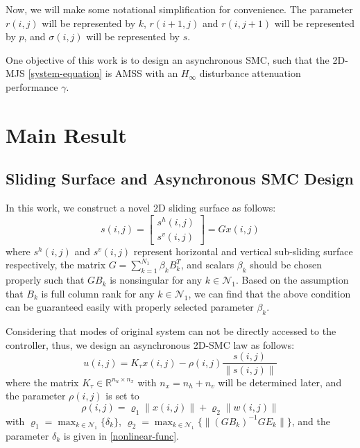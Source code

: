 \documentclass[journal,final,twocolumn]{IEEEtran}
\begin{document}
	Now, we will make some notational simplification for convenience. The parameter $r(i,j)$ will be represented by $k$, $r(i+1,j)$ and $r(i,j+1)$ will be represented by $p$, and $\sigma(i,j)$ will be represented by $s$. 
	
	
	
	 One objective of this work is to design an asynchronous  SMC, such that the 2D-MJS \eqref{system-equation} is AMSS with an $H_{\infty}$ disturbance attenuation performance $\gamma$. 

\section{Main Result}

\subsection{ Sliding Surface and Asynchronous SMC Design} \label{sliding-surface}
	In this work, we construct a novel 2D sliding surface as follows: 
	\begin{equation}\label{siding-surface-equation}	
		s(i,j) = \begin{bmatrix}
					s^{h}(i,j)\\
					s^{v}(i,j)
					\end{bmatrix}
			   = Gx(i,j)
	\end{equation}
	where $s^{h}(i,j)$ and $s^{v}(i,j)$ represent horizontal and vertical sub-sliding surface respectively, the matrix $G=\sum_{k=1}^{N_{1}}\beta_{k}B^{T}_{k}$, and scalars $\beta_{k}$ should be chosen properly such that $GB_{k}$ is nonsingular for any $k\in\mathcal{N}_{1}$. Based on the assumption that $B_{k}$ is full column rank for any $k\in\mathcal{N}_{1}$, we can find that the above condition can be guaranteed easily with properly selected parameter $\beta_{k}$. 
 	
 	Considering that modes of original system can not be directly accessed  to the controller,  thus, we design an asynchronous 2D-SMC law as follows:
	\begin{equation}\label{smc-law}
		u(i,j) = K_{\tau }x(i,j)-\rho(i,j)\frac{s(i,j)}{\|s(i,j)\|}
	\end{equation}
	where the matrix $K_{\tau }\in\mathbb{R}^{n_u\times n_x}$ with $n_x=n_h+n_v$ will be determined later, and the parameter $\rho(i,j)$ is set to
	\begin{equation}\label{varrho}
	\rho(i,j) = \varrho_{1}\|x(i,j)\| + \varrho_{2}\|w(i,j)\|
	\end{equation}
	with $\varrho_{1}=\max_{k\in\mathcal{N}_{1}} \{\delta_{k} \}$, $\varrho_{2} = \max_{k\in\mathcal{N}_{1}}\{\|(GB_{k})^{-1}GE_{k}\| \} $, and the parameter $\delta_{k}$ is given in \eqref{nonlinear-func}. 
	
\end{document}
